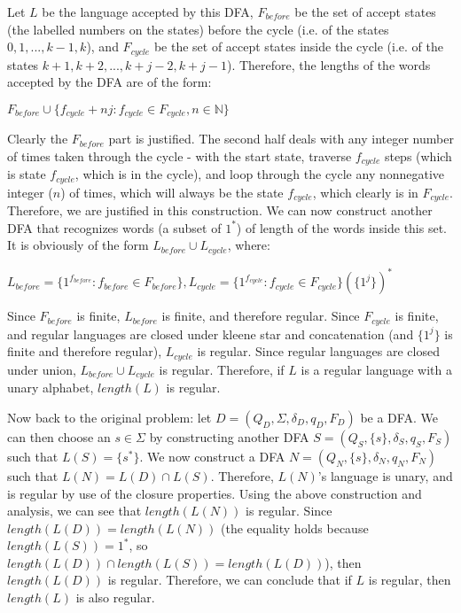\documentclass[10pt]{article}
\begin{document}
\begin{enumerate}
\begin{enumerate}
\par Let $L$ be the language accepted by this DFA, $F_{before}$ be the set of accept states (the labelled numbers on the states) before the cycle (i.e. of the states $0, 1, ..., k-1, k$), and $F_{cycle}$ be the set of accept states inside the cycle (i.e. of the states $k+1, k+2, ..., k+j-2, k+j-1$). Therefore, the lengths of the words accepted by the DFA are of the form:
\begin{center}
$F_{before} \cup \{f_{cycle} + nj : f_{cycle} \in F_{cycle}, n \in \mathbb{N}\}$
\end{center}
\par Clearly the $F_{before}$ part is justified. The second half deals with any integer number of times taken through the cycle - with the start state, traverse $f_{cycle}$ steps (which is state $f_{cycle}$, which is in the cycle), and loop through the cycle any nonnegative integer ($n$) of times, which will always be the state $f_{cycle}$, which clearly is in $F_{cycle}$. Therefore, we are justified in this construction. We can now construct another DFA that recognizes words (a subset of $1^*$) of length of the words inside this set. It is obviously of the form $L_{before} \cup L_{cycle}$, where:
\begin{center}
$L_{before} = \{1^{f_{before}} : f_{before} \in F_{before}\}, L_{cycle} = \{1^{f_{cycle}} : f_{cycle} \in F_{cycle}\}(\{1^{j}\})^*$
\end{center}
\par Since $F_{before}$ is finite, $L_{before}$ is finite, and therefore regular. Since $F_{cycle}$ is finite, and regular languages are closed under kleene star and concatenation (and $\{1^j\}$ is finite and therefore regular), $L_{cycle}$ is regular. Since regular languages are closed under union, $L_{before} \cup L_{cycle}$ is regular. Therefore, if $L$ is a regular language with a unary alphabet, $length(L)$ is regular.
\end{enumerate}

\par Now back to the original problem: let $D =(Q_D, \Sigma, \delta_D, q_{D}, F_D)$ be a DFA. We can then choose an $s \in \Sigma$ by constructing another DFA $S = (Q_S, \{s\}, \delta_S, q_{S}, F_S)$ such that $L(S) = \{s^*\}$. We now construct a DFA $N = (Q_N, \{s\}, \delta_N, q_{N}, F_N)$ such that $L(N) = L(D) \cap L(S)$. Therefore, $L(N)$'s language is unary, and is regular by use of the closure properties. Using the above construction and analysis, we can see that $length(L(N))$ is regular. Since $length(L(D)) = length(L(N))$ (the equality holds because $length(L(S)) = 1^*$, so $length(L(D)) \cap length(L(S)) = length(L(D))$), then $length(L(D))$ is regular. Therefore, we can conclude that if $L$ is regular, then $length(L)$ is also regular.


\end{enumerate}
\end{document}
